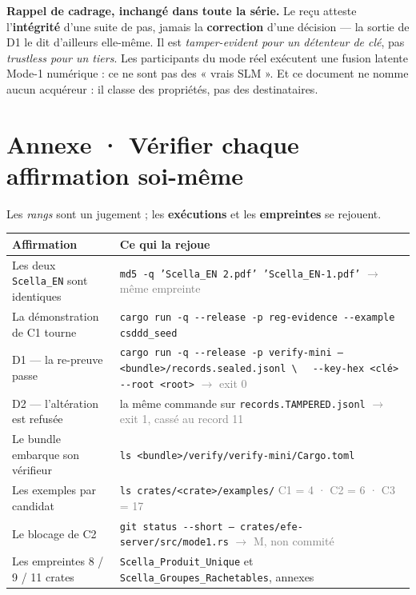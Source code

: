 \documentclass[10pt]{article}
\newcommand{\sz}[1]{\textcolor{grey}{\small\textsf{#1}}}
\newcommand{\code}[1]{\texttt{\small #1}}
\begin{document}
\begin{these}
\small\textbf{Rappel de cadrage, inchangé dans toute la série.} Le reçu atteste l'\textbf{intégrité}
d'une suite de pas, jamais la \textbf{correction} d'une décision --- la sortie de D1 le dit d'ailleurs
elle-même. Il est \emph{tamper-evident pour un détenteur de clé}, pas \emph{trustless pour un tiers}.
Les participants du mode réel exécutent une fusion latente Mode-1 numérique : ce ne sont pas des
« vrais SLM ». Et ce document ne nomme aucun acquéreur : il classe des propriétés, pas des
destinataires.
\end{these}

\section{Annexe · Vérifier chaque affirmation soi-même}

Les \emph{rangs} sont un jugement ; les \textbf{exécutions} et les \textbf{empreintes} se rejouent.

\renewcommand{\arraystretch}{1.22}
\begin{center}\small
\begin{tabular}{@{}>{\raggedright\arraybackslash}p{5.2cm} >{\raggedright\arraybackslash}p{10.9cm}@{}}
\toprule
\textbf{Affirmation} & \textbf{Ce qui la rejoue} \\
\midrule
Les deux \code{Scella\_EN} sont identiques &
  \code{md5 -q 'Scella\_EN 2.pdf' 'Scella\_EN-1.pdf'} \sz{$\rightarrow$ même empreinte} \\
La démonstration de C1 tourne &
  \code{cargo run -q -{}-release -p reg-evidence -{}-example csddd\_seed} \\
D1 --- la re-preuve passe &
  \code{cargo run -q -{}-release -p verify-mini -- <bundle>/records.sealed.jsonl \textbackslash} \newline
  \code{\ \ -{}-key-hex <clé> -{}-root <root>} \sz{$\rightarrow$ exit 0} \\
D2 --- l'altération est refusée &
  la même commande sur \code{records.TAMPERED.jsonl} \sz{$\rightarrow$ exit 1, cassé au record 11} \\
Le bundle embarque son vérifieur &
  \code{ls <bundle>/verify/verify-mini/Cargo.toml} \\
Les exemples par candidat &
  \code{ls crates/<crate>/examples/} \sz{C1 = 4 · C2 = 6 · C3 = 17} \\
Le blocage de C2 &
  \code{git status -{}-short -- crates/efe-server/src/mode1.rs} \sz{$\rightarrow$ M, non commité} \\
Les empreintes 8 / 9 / 11 crates &
  \code{Scella\_Produit\_Unique} et \code{Scella\_Groupes\_Rachetables}, annexes \\
\bottomrule
\end{tabular}
\end{center}
\end{document}
